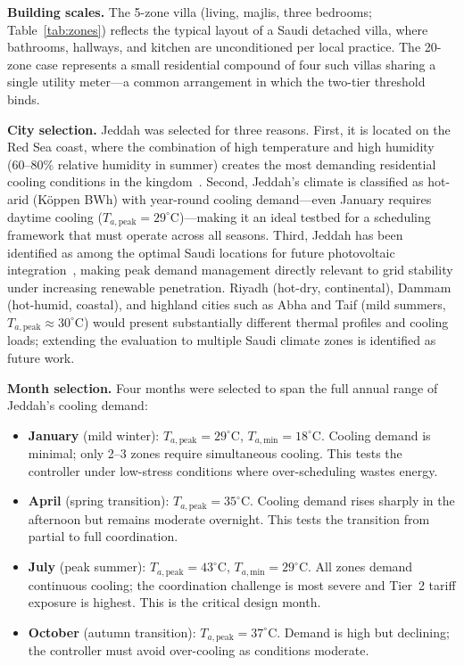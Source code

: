 \documentclass[12pt,a4paper]{article}
\begin{document}
\textbf{Building scales.} The 5-zone villa (living, majlis, three bedrooms; Table~\ref{tab:zones}) reflects the typical layout of a Saudi detached villa, where bathrooms, hallways, and kitchen are unconditioned per local practice. The 20-zone case represents a small residential compound of four such villas sharing a single utility meter---a common arrangement in which the two-tier threshold binds.

\textbf{City selection.} Jeddah was selected for three reasons. First, it is located on the Red Sea coast, where the combination of high temperature and high humidity (60--80\% relative humidity in summer) creates the most demanding residential cooling conditions in the kingdom~\cite{ref2}. Second, Jeddah's climate is classified as hot-arid (K\"{o}ppen BWh) with year-round cooling demand---even January requires daytime cooling ($T_{a,\text{peak}} = 29^\circ$C)---making it an ideal testbed for a scheduling framework that must operate across all seasons. Third, Jeddah has been identified as among the optimal Saudi locations for future photovoltaic integration~\cite{ref15}, making peak demand management directly relevant to grid stability under increasing renewable penetration. Riyadh (hot-dry, continental), Dammam (hot-humid, coastal), and highland cities such as Abha and Taif (mild summers, $T_{a,\text{peak}} \approx 30^\circ$C) would present substantially different thermal profiles and cooling loads; extending the evaluation to multiple Saudi climate zones is identified as future work.

\textbf{Month selection.} Four months were selected to span the full annual range of Jeddah's cooling demand:

\begin{itemize}
\item \textbf{January} (mild winter): $T_{a,\text{peak}} = 29^\circ$C, $T_{a,\text{min}} = 18^\circ$C. Cooling demand is minimal; only 2--3 zones require simultaneous cooling. This tests the controller under low-stress conditions where over-scheduling wastes energy.
\item \textbf{April} (spring transition): $T_{a,\text{peak}} = 35^\circ$C. Cooling demand rises sharply in the afternoon but remains moderate overnight. This tests the transition from partial to full coordination.
\item \textbf{July} (peak summer): $T_{a,\text{peak}} = 43^\circ$C, $T_{a,\text{min}} = 29^\circ$C. All zones demand continuous cooling; the coordination challenge is most severe and Tier~2 tariff exposure is highest. This is the critical design month.
\item \textbf{October} (autumn transition): $T_{a,\text{peak}} = 37^\circ$C. Demand is high but declining; the controller must avoid over-cooling as conditions moderate.
\end{itemize}
\end{document}
